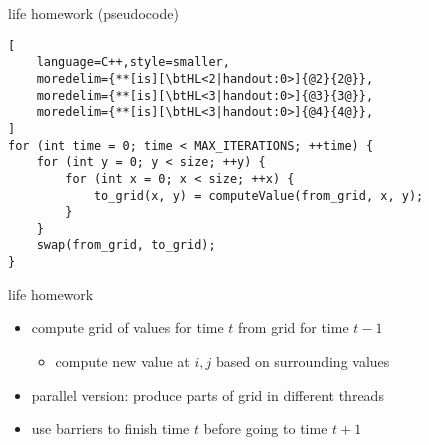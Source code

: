 \begin{frame}[fragile,label=lifeHW]{life homework (pseudocode)}
\begin{lstlisting}[
    language=C++,style=smaller,
    moredelim={**[is][\btHL<2|handout:0>]{@2}{2@}},
    moredelim={**[is][\btHL<3|handout:0>]{@3}{3@}},
    moredelim={**[is][\btHL<3|handout:0>]{@4}{4@}},
]
for (int time = 0; time < MAX_ITERATIONS; ++time) {
    for (int y = 0; y < size; ++y) {
        for (int x = 0; x < size; ++x) {
            to_grid(x, y) = computeValue(from_grid, x, y);
        }
    }
    swap(from_grid, to_grid);
}
\end{lstlisting}
\end{frame}

\begin{frame}{life homework}
\begin{itemize}
\item compute grid of values for time $t$ from grid for time $t-1$
    \begin{itemize}
    \item compute new value at $i,j$ based on surrounding values
    \end{itemize}
\vspace{.5cm}
\item parallel version: produce parts of grid in different threads
\item use barriers to finish time $t$ before going to time $t+1$
\end{itemize}
\end{frame}

